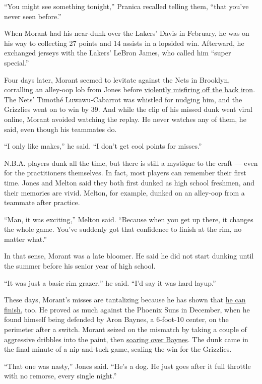 ``You might see something tonight,'' Pranica recalled telling them,
``that you've never seen before.''

When Morant had his near-dunk over the Lakers' Davis in February, he was
on his way to collecting 27 points and 14 assists in a lopsided win.
Afterward, he exchanged jerseys with the Lakers' LeBron James, who
called him ``super special.''

Four days later, Morant seemed to levitate against the Nets in Brooklyn,
corralling an alley-oop lob from Jones before
\href{https://www.youtube.com/watch?v=DM4xRtygt-0}{violently misfiring
off the back iron}. The Nets' Timothé Luwawu-Cabarrot was whistled for
nudging him, and the Grizzlies went on to win by 39. And while the clip
of his missed dunk went viral online, Morant avoided watching the
replay. He never watches any of them, he said, even though his teammates
do.

``I only like makes,'' he said. ``I don't get cool points for misses.''

N.B.A. players dunk all the time, but there is still a mystique to the
craft --- even for the practitioners themselves. In fact, most players
can remember their first time. Jones and Melton said they both first
dunked as high school freshmen, and their memories are vivid. Melton,
for example, dunked on an alley-oop from a teammate after practice.

``Man, it was exciting,'' Melton said. ``Because when you get up there,
it changes the whole game. You've suddenly got that confidence to finish
at the rim, no matter what.''

In that sense, Morant was a late bloomer. He said he did not start
dunking until the summer before his senior year of high school.

``It was just a basic rim grazer,'' he said. ``I'd say it was hard
layup.''

These days, Morant's misses are tantalizing because he has shown that
\href{https://www.youtube.com/watch?v=DdgAGzQRTfg}{he can finish}, too.
He proved as much against the Phoenix Suns in December, when he found
himself being defended by Aron Baynes, a 6-foot-10 center, on the
perimeter after a switch. Morant seized on the mismatch by taking a
couple of aggressive dribbles into the paint, then
\href{https://www.youtube.com/watch?v=KUcpjuJRnpg}{soaring over Baynes}.
The dunk came in the final minute of a nip-and-tuck game, sealing the
win for the Grizzlies.

``That one was nasty,'' Jones said. ``He's a dog. He just goes after it
full throttle with no remorse, every single night.''

